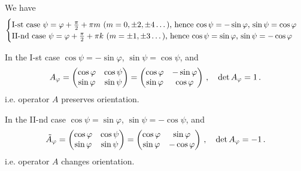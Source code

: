 \documentclass[12pt]{article}
\numberwithin{equation}{section}
\begin{document}
   We have
                  $$
               \begin{cases}
\hbox{I-st case $\psi=\varphi+{\pi\over 2}+\pi m$ ($m=0,\pm 2,\pm 4\dots$),
hence $\cos\psi=-\sin\varphi$,  $\sin\psi=\cos\varphi$}\cr
\hbox {II-nd  case $\psi=\varphi+{\pi\over 2}+\pi k $ ($m=\pm 1,\pm 3\dots$),
hence  $\cos\psi=\sin\varphi$,  $\sin\psi=-\cos\varphi$}\cr
           \end{cases}
                 $$

In the I-st case $\cos\psi=-\sin\varphi$,  $\sin\psi=\cos\psi$, and
           \begin{equation}\label{orthogonalrotation}
  A_\varphi=  
            \begin{pmatrix}
          \cos\varphi  & \cos\psi\cr 
          \sin\varphi & \sin\psi\cr 
              \end{pmatrix}=
            \begin{pmatrix}
          \cos\varphi  & -\sin\varphi\cr 
          \sin\varphi & \cos\varphi\cr 
              \end{pmatrix}\,,\quad
\det A_\varphi=1\,.
           \end{equation}
i.e. operator $A$ preserves orientation.

In the II-nd  case $\cos\psi=\sin\varphi$,  $\sin\psi=-\cos\psi$, and
           \begin{equation}\label{orthogonalrotation+reflection}
  \tilde A_\varphi=  
            \begin{pmatrix}
          \cos\varphi  & \cos\psi\cr 
          \sin\varphi & \sin\psi\cr 
              \end{pmatrix}=
            \begin{pmatrix}
          \cos\varphi  & \sin\varphi\cr 
          \sin\varphi & -\cos\varphi\cr 
              \end{pmatrix}\,,\quad
\det A_\varphi=-1\,.
           \end{equation}
i.e. operator $A$ changes orientation.



\m
\end{document}
